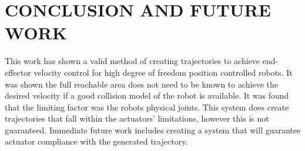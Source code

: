 \section{CONCLUSION AND FUTURE WORK}
This work has shown a valid method of creating trajectories to achieve end-effector velocity control for high degree of freedom position controlled robots.  It was shown the full reachable area does not need to be known to achieve the desired velocity if a good collision model of the robot is available.  It was found that the limiting factor was the robots physical joints.  This system does create trajectories that fall within the actuators' limitations, however this is not guaranteed.  Immediate future work includes creating a system that will guarantee actuator compliance with the generated trajectory.